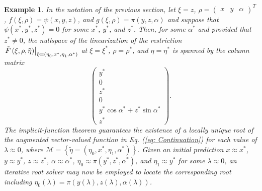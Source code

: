 \documentclass{article}
\newtheorem{example}[theorem]{Example}
\begin{document}
\begin{example}
\label{y continuation}In the notation of the previous section, let $\xi =z$, 
$\rho =\left( 
\begin{array}{ccc}
x & y & \alpha%
\end{array}%
\right) ^{T}$, $f\left( \xi ,\rho \right) =\psi \left( x,y,z\right) $, and $%
g\left( \xi ,\rho \right) =\pi \left( y,z,\alpha \right) $ and suppose that $%
\psi \left( x^{\ast },y^{\ast },z^{\ast }\right) =0$ for some $x^{\ast }$, $%
y^{\ast }$, and $z^{\ast }$. Then, for some $\alpha ^{\ast }$ and provided
that $z^{\ast }\neq 0$, the nullspace of the linearization of the
restriction $\left. \tilde{F}\left( \xi ,\rho ,\tilde{\eta}\right) \right| _{%
\tilde{\eta}=\left( \eta _{0},x^{\ast },\eta _{1},\alpha ^{\ast }\right) }$
at $\xi =\xi ^{\ast }$, $\rho =\rho ^{\ast }$, and $\eta =\eta ^{\ast }$ is
spanned by the column matrix%
\[
\left( 
\begin{array}{c}
y^{\ast } \\ 
0 \\ 
z^{\ast } \\ 
0 \\ 
y^{\ast }\cos \alpha ^{\ast }+z^{\ast }\sin \alpha ^{\ast } \\ 
z^{\ast }%
\end{array}%
\right) . 
\]%
The implicit-function theorem guarantees the existence of a locally unique
root of the augmented vector-valued function in Eq. (\ref{eq: Continuation})
for each value of $\lambda \approx 0$, where $\mathcal{M}=\left\{ \tilde{\eta%
}=\left( \eta _{0},x^{\ast },\eta _{1},\alpha ^{\ast }\right) \right\} $.
Given an initial prediction $x\approx x^{\ast }$, $y\approx y^{\ast }$, $%
z\approx z^{\ast }$, $\alpha \approx \alpha ^{\ast }$, $\eta _{0}\approx \pi
\left( y^{\ast },z^{\ast },\alpha ^{\ast }\right) $, and $\eta _{1}\approx
y^{\ast }$ for some $\lambda \approx 0$, an iterative root solver may now be
employed to locate the corresponding root including $\eta _{0}\left( \lambda
\right) =\pi \left( y\left( \lambda \right) ,z\left( \lambda \right) ,\alpha
\left( \lambda \right) \right) $.
\end{example}
\end{document}
